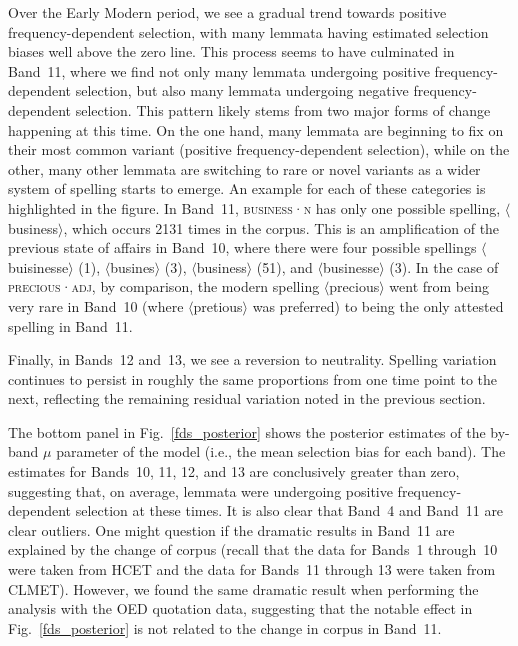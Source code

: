\documentclass[doc,biblatex]{apa7}
\newcommand\lemma[2]{\textsc{#1·#2}}
\newcommand\spelling[1]{\allowbreak$\langle$#1$\rangle$}
\begin{document}
Over the Early Modern period, we see a gradual trend towards positive frequency-dependent selection, with many lemmata having estimated selection biases well above the zero line. This process seems to have culminated in Band~11, where we find not only many lemmata undergoing positive frequency-dependent selection, but also many lemmata undergoing negative frequency-dependent selection. This pattern likely stems from two major forms of change happening at this time. On the one hand, many lemmata are beginning to fix on their most common variant (positive frequency-dependent selection), while on the other, many other lemmata are switching to rare or novel variants as a wider system of spelling starts to emerge. An example for each of these categories is highlighted in the figure. In Band~11, \lemma{business}{n} has only one possible spelling, \spelling{business}, which occurs 2131 times in the corpus. This is an amplification of the previous state of affairs in Band~10, where there were four possible spellings \spelling{buisinesse} (1), \spelling{busines} (3), \spelling{business} (51), and \spelling{businesse} (3). In the case of \lemma{precious}{adj}, by comparison, the modern spelling \spelling{precious} went from being very rare in Band~10 (where \spelling{pretious} was preferred) to being the only attested spelling in Band~11.

Finally, in Bands~12 and~13, we see a reversion to neutrality. Spelling variation continues to persist in roughly the same proportions from one time point to the next, reflecting the remaining residual variation noted in the previous section.

The bottom panel in Fig.~\ref{fds_posterior} shows the posterior estimates of the by-band $\mu$ parameter of the model (i.e., the mean selection bias for each band). The estimates for Bands~10, 11, 12, and 13 are conclusively greater than zero, suggesting that, on average, lemmata were undergoing positive frequency-dependent selection at these times. It is also clear that Band~4 and Band~11 are clear outliers. One might question if the dramatic results in Band~11 are explained by the change of corpus (recall that the data for Bands~1 through~10 were taken from HCET and the data for Bands~11 through 13 were taken from CLMET). However, we found the same dramatic result when performing the analysis with the OED quotation data, suggesting that the notable effect in Fig.~\ref{fds_posterior} is not related to the change in corpus in Band~11.

\end{document}
